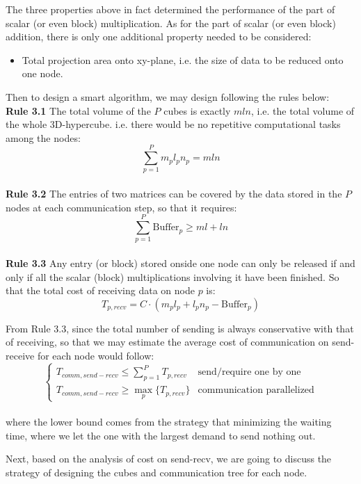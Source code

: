 \documentclass{amsart}
\theoremstyle{definition}
\theoremstyle{remark}
\numberwithin{equation}{section}
\begin{document}
The three properties above in fact determined the performance of the part of scalar (or even block) multiplication. As for the part of scalar (or even block) addition, there is only one additional property needed to be considered:\par
\begin{itemize}
\item Total projection area onto xy-plane, i.e. the size of data to be reduced onto one node.
\end{itemize}

Then to design a smart algorithm, we may design following the rules below:\\
\textbf{Rule 3.1} The total volume of the $P$ cubes is exactly $mln$, i.e. the total volume of the whole 3D-hypercube. i.e. there would be no repetitive computational tasks among the nodes:
\begin{equation}
\sum_{p=1}^{P}m_pl_pn_p=mln
\end{equation}
\\
\textbf{Rule 3.2} The entries of two matrices can be covered by the data stored in the $P$ nodes at each communication step, so that it requires:
\begin{equation}
\sum_{p=1}^{P}\text{Buffer}_p\ge ml+ln
\end{equation}
\\
\textbf{Rule 3.3} Any entry (or block) stored onside one node can only be released if and only if all the scalar (block) multiplications involving it have been finished. So that the total cost of receiving data on node $p$ is:
\begin{equation}
T_{p,recv}=C\cdot(m_pl_p+l_pn_p-\text{Buffer}_p)
\end{equation}

\par
	From Rule 3.3, since the total number of sending is always conservative with that of receiving, so that we may estimate the average cost of communication on send-receive for each node would follow: 
\begin{equation}
\left\{
	\begin{array}{ll}  
          T_{comm,send-recv}\le\sum_{p=1}^{P}T_{p,recv}  & \text{send/require one by one}\\ 
          T_{comm,send-recv}\ge\max \limits_{p}\{T_{p,recv}\} & \text{communication parallelized}
	\end{array}
\right.
\end{equation}
\\
where the lower bound comes from the strategy that minimizing the waiting time, where we let the one with the largest demand to send nothing out.\par
	Next, based on the analysis of cost on send-recv, we are going to discuss the strategy of designing the cubes and communication tree for each node.
\end{document}
